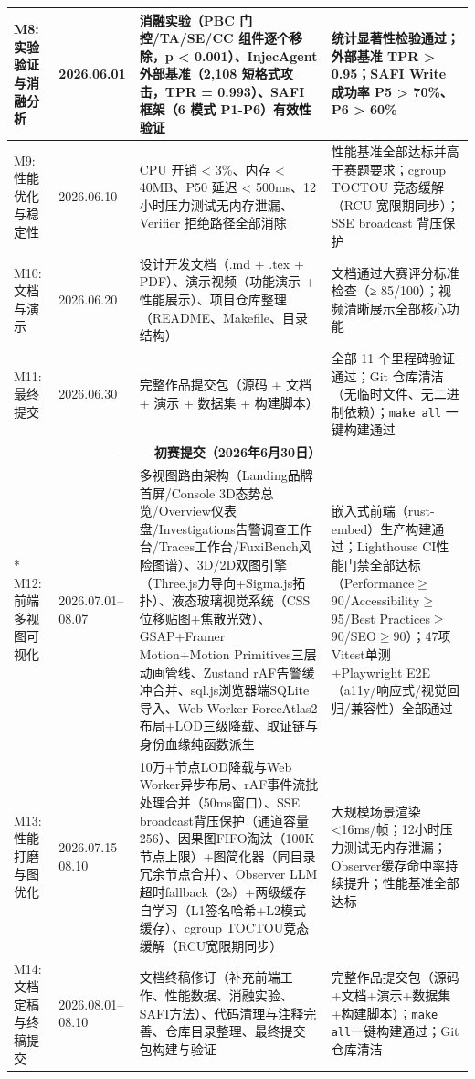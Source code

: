 \documentclass[a4paper]{ctexart}
\makeatletter
\renewcommand{\_}{%
  \ifmmode
    \nfss@text{\textunderscore}%
  \else
    \textunderscore\discretionary{}{}{}%
  \fi}
\makeatother
\begin{document}
{\begin{longtable}{p{4.3cm} p{2.7cm} >{\raggedright\arraybackslash}p{3.7cm} >{\raggedright\arraybackslash}p{3.7cm}}
\hline
M8: 实验验证与消融分析 & 2026.06.01 & 消融实验（PBC 门控/TA/SE/CC 组件逐个移除，p < 0.001）、InjecAgent 外部基准（2,108 短格式攻击，TPR = 0.993）、SAFI 框架（6 模式 P1-P6）有效性验证 & 统计显著性检验通过；外部基准 TPR > 0.95；SAFI Write 成功率 P5 > 70\%、P6 > 60\% \\
\hline
M9: 性能优化与稳定性 & 2026.06.10 & CPU 开销 < 3\%、内存 < 40MB、P50 延迟 < 500ms、12 小时压力测试无内存泄漏、Verifier 拒绝路径全部消除 & 性能基准全部达标并高于赛题要求；cgroup TOCTOU 竞态缓解（RCU 宽限期同步）；SSE broadcast 背压保护 \\
\hline
M10: 文档与演示 & 2026.06.20 & 设计开发文档（.md + .tex + PDF）、演示视频（功能演示 + 性能展示）、项目仓库整理（README、Makefile、目录结构） & 文档通过大赛评分标准检查（≥ 85/100）；视频清晰展示全部核心功能 \\
\hline
M11: 最终提交 & 2026.06.30 & 完整作品提交包（源码 + 文档 + 演示 + 数据集 + 构建脚本） & 全部 11 个里程碑验证通过；Git 仓库清洁（无临时文件、无二进制依赖）；\texttt{make all} 一键构建通过 \\
\hline
\multicolumn{4}{c}{\textbf{—— 初赛提交（2026年6月30日） ——}} \\*
\hline
M12: 前端多视图可视化 & 2026.07.01--08.07 & 多视图路由架构（Landing品牌首屏/Console 3D态势总览/Overview仪表盘/Investigations告警调查工作台/Traces工作台/FuxiBench风险图谱）、3D/2D双图引擎（Three.js力导向+Sigma.js拓扑）、液态玻璃视觉系统（CSS位移贴图+焦散光效）、GSAP+Framer Motion+Motion Primitives三层动画管线、Zustand rAF告警缓冲合并、sql.js浏览器端SQLite导入、Web Worker ForceAtlas2布局+LOD三级降载、取证链与身份血缘纯函数派生 & 嵌入式前端（rust-embed）生产构建通过；Lighthouse CI性能门禁全部达标（Performance$\geq$90/Accessibility$\geq$95/Best Practices$\geq$90/SEO$\geq$90）；47项Vitest单测+Playwright E2E（a11y/响应式/视觉回归/兼容性）全部通过 \\
\hline
M13: 性能打磨与图优化 & 2026.07.15--08.10 & 10万+节点LOD降载与Web Worker异步布局、rAF事件流批处理合并（50ms窗口）、SSE broadcast背压保护（通道容量256）、因果图FIFO淘汰（100K节点上限）+图简化器（同目录冗余节点合并）、Observer LLM超时fallback（2s）+两级缓存自学习（L1签名哈希+L2模式缓存）、cgroup TOCTOU竞态缓解（RCU宽限期同步） & 大规模场景渲染<16ms/帧；12小时压力测试无内存泄漏；Observer缓存命中率持续提升；性能基准全部达标 \\
\hline
M14: 文档定稿与终稿提交 & 2026.08.01--08.10 & 文档终稿修订（补充前端工作、性能数据、消融实验、SAFI方法）、代码清理与注释完善、仓库目录整理、最终提交包构建与验证 & 完整作品提交包（源码+文档+演示+数据集+构建脚本）；\texttt{make all}一键构建通过；Git仓库清洁 \\
\hline
\end{longtable}
\par}
\end{document}
